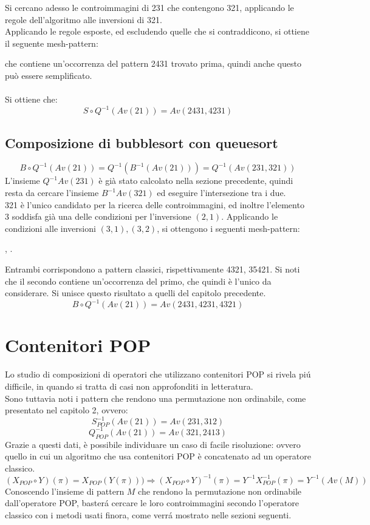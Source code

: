 Si cercano adesso le controimmagini di 231 che contengono 321, applicando le regole dell'algoritmo alle inversioni di 321.\\
Applicando le regole esposte, ed escludendo quelle che si contraddicono, si ottiene il seguente mesh-pattern: 
\begin{center}
\end{center}
che contiene un'occorrenza del pattern 2431 trovato prima, quindi anche questo pu\`o essere semplificato.\\\\
Si ottiene che:$$S\circ Q^{-1}(Av(21)) = Av(2431, 4231)$$
\subsection{Composizione di {bubblesort} con {queuesort}}
$$B\circ Q^{-1}(Av(21)) = Q^{-1}(B^{-1}(Av(21))) = Q^{-1}(Av(231,321))$$
L'insieme $Q^{-1}Av(231)$ \`e gi\`a stato calcolato nella sezione precedente, quindi resta da cercare l'insieme $B^{-1}Av(321)$ ed eseguire l'intersezione tra i due.\\321 \`e l'unico candidato per la ricerca delle controimmagini, ed inoltre l'elemento 3 soddisfa gi\`a una delle condizioni per l'inversione $(2,1)$. Applicando le condizioni alle inversioni $(3,1),(3,2)$, si ottengono i seguenti mesh-pattern:
\begin{center}
,
.
\end{center}  
Entrambi corrispondono a pattern classici, rispettivamente 4321, 35421. Si noti che il secondo contiene un'occorrenza del primo, che quindi \`e l'unico da considerare. Si unisce questo risultato a quelli del capitolo precedente.
$$B\circ Q^{-1}(Av(21)) = Av(2431, 4231, 4321)$$ 
\section{Contenitori POP}
Lo studio di composizioni di operatori che utilizzano contenitori POP si rivela pi\'u difficile, in quando si tratta di casi non approfonditi in letteratura.\\
Sono tuttavia noti i pattern che rendono una permutazione non ordinabile, come presentato nel capitolo 2, ovvero:
$$S_{POP}^{-1}(Av(21)) = Av(231,312)$$$$Q_{POP}^{-1}(Av(21))=Av(321,2413)$$
Grazie a questi dati, \`e possibile individuare un caso di facile risoluzione: ovvero quello in cui un algoritmo che usa contenitori POP \`e concatenato ad un operatore classico.
$$(X_{POP}\circ{Y})(\pi)= X_{POP}(Y(\pi)))\Rightarrow(X_{POP}\circ{Y})^{-1}(\pi) = Y^{-1}X_{POP}^{-1}(\pi)=Y^{-1}(Av(M))$$
Conoscendo l'insieme di pattern $M$ che rendono la permutazione non ordinabile dall'operatore POP, baster\'a cercare le loro controimmagini secondo l'operatore classico con i metodi usati finora, come verr\'a mostrato nelle sezioni seguenti.
